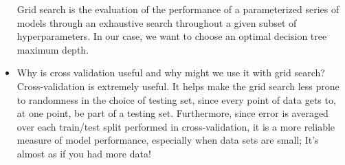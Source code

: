 \documentclass{amsart}
\begin{document}
\begin{itemize}
		Grid search is the evaluation of the performance of a parameterized series of models through an exhaustive search throughout a given subset of hyperparameters.  In our case, we want to choose an optimal decision tree maximum depth.\vspace{1mm}
	\item Why is cross validation useful and why might we use it with grid search? \vspace{1mm}\\
		Cross-validation is extremely useful.  It helps make the grid search less prone to randomness in the choice of testing set, since every point of data gets to, at one point, be part of a testing set.  Furthermore, since error is averaged over each train/test split performed in cross-validation, it is a more reliable measure of model performance, especially when data sets are small; It's almost as if you had more data!
\end{itemize}
\end{document}
